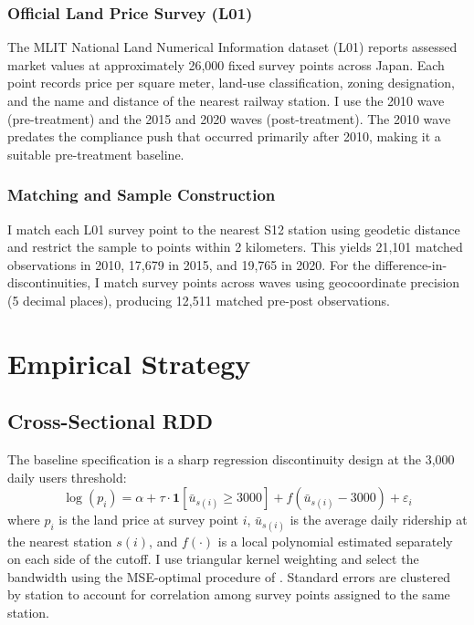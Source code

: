 \documentclass[12pt]{article}
\begin{document}
\subsubsection*{Official Land Price Survey (L01)}  The MLIT National Land Numerical Information dataset (L01) reports assessed market values at approximately 26,000 fixed survey points across Japan. Each point records price per square meter, land-use classification, zoning designation, and the name and distance of the nearest railway station. I use the 2010 wave (pre-treatment) and the 2015 and 2020 waves (post-treatment). The 2010 wave predates the compliance push that occurred primarily after 2010, making it a suitable pre-treatment baseline.

\subsubsection*{Matching and Sample Construction}  I match each L01 survey point to the nearest S12 station using geodetic distance and restrict the sample to points within 2 kilometers. This yields 21,101 matched observations in 2010, 17,679 in 2015, and 19,765 in 2020. For the difference-in-discontinuities, I match survey points across waves using geocoordinate precision (5 decimal places), producing 12,511 matched pre-post observations.




\section{Empirical Strategy}

\subsection{Cross-Sectional RDD}

The baseline specification is a sharp regression discontinuity design at the 3,000 daily users threshold:
\begin{equation}
\log(p_i) = \alpha + \tau \cdot \mathbf{1}[\bar{u}_{s(i)} \geq 3000] + f(\bar{u}_{s(i)} - 3000) + \varepsilon_i
\label{eq:rdd}
\end{equation}
where $p_i$ is the land price at survey point $i$, $\bar{u}_{s(i)}$ is the average daily ridership at the nearest station $s(i)$, and $f(\cdot)$ is a local polynomial estimated separately on each side of the cutoff. I use triangular kernel weighting and select the bandwidth using the MSE-optimal procedure of \citet{cattaneo2020}. Standard errors are clustered by station to account for correlation among survey points assigned to the same station.
\end{document}

